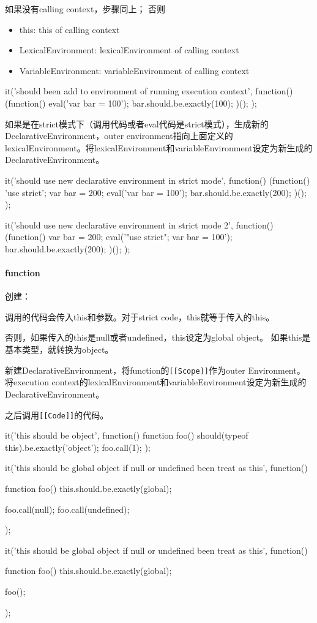 如果没有calling context，步骤同上；
否则
\begin{itemize}
\item this: this of calling context
\item LexicalEnvironment: lexicalEnvironment of calling context
\item VariableEnvironment: variableEnvironment of calling context
\end{itemize}
\begin{JavaScript}
		it('should been add to environment of running execution context', function(){
			(function(){
				eval('var bar = 100');
				bar.should.be.exactly(100);
			})();
		});
\end{JavaScript}
如果是在strict模式下（调用代码或者eval代码是strict模式），生成新的DeclarativeEnvironment，outer environment指向上面定义的lexicalEnvironment。将lexicalEnvironment和variableEnvironment设定为新生成的DeclarativeEnvironment。
\begin{JavaScript}
		it('should use new declarative environment in strict mode', function(){
			(function(){
				'use strict';
				var bar = 200;
				eval('var bar = 100');
				bar.should.be.exactly(200);
			})();
		});

		it('should use new declarative environment in strict mode 2', function(){
			(function(){
				var bar = 200;
				eval('"use strict"; var bar = 100');
				bar.should.be.exactly(200);
			})();
		});
\end{JavaScript}
\paragraph{function}
创建：

调用的代码会传入this和参数。对于strict code，this就等于传入的this。

否则，如果传入的this是null或者undefined，this设定为global object。
如果this是基本类型，就转换为object。

新建DeclarativeEnvironment，将function的\lstinline![[Scope]]!作为outer Environment。将execution context的lexicalEnvironment和variableEnvironment设定为新生成的DeclarativeEnvironment。

之后调用\lstinline![[Code]]!的代码。

\begin{JavaScript}[this是object]
		it('this should be object', function(){
			function foo(){
				should(typeof this).be.exactly('object');
			}
			foo.call(1);
		});
\end{JavaScript}

\begin{JavaScript}
		it('this should be global object if null or undefined been treat as this', function(){
			function foo(){
				this.should.be.exactly(global);
			}

			foo.call(null);
			foo.call(undefined);
		});

		it('this should be global object if null or undefined been treat as this', function(){
			function foo(){
				this.should.be.exactly(global);
			}

			foo();
		});
\end{JavaScript}

